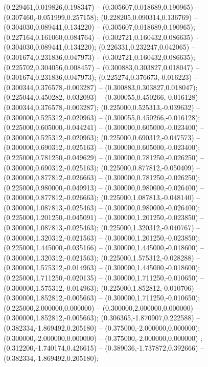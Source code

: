  (0.229461,0.019826,0.198347) -- (0.305607,0.018689,0.190965) -- (0.307460,-0.051999,0.257158);
 (0.228205,0.090314,0.136769) -- (0.304030,0.089441,0.134220) -- (0.305607,0.018689,0.190965);
 (0.227164,0.161060,0.084764) -- (0.302721,0.160432,0.086635) -- (0.304030,0.089441,0.134220);
 (0.226331,0.232247,0.042065) -- (0.301674,0.231836,0.047973) -- (0.302721,0.160432,0.086635);
 (0.225702,0.304056,0.008457) -- (0.300883,0.303827,0.018047) -- (0.301674,0.231836,0.047973);
 (0.225274,0.376673,-0.016223) -- (0.300344,0.376578,-0.003287) -- (0.300883,0.303827,0.018047);
 (0.225044,0.450282,-0.032093) -- (0.300055,0.450266,-0.016128) -- (0.300344,0.376578,-0.003287);
 (0.225000,0.525313,-0.039632) -- (0.300000,0.525312,-0.020963) -- (0.300055,0.450266,-0.016128);
 (0.225000,0.605000,-0.044241) -- (0.300000,0.605000,-0.023400) -- (0.300000,0.525312,-0.020963);
 (0.225000,0.690312,-0.047573) -- (0.300000,0.690312,-0.025163) -- (0.300000,0.605000,-0.023400);
 (0.225000,0.781250,-0.049629) -- (0.300000,0.781250,-0.026250) -- (0.300000,0.690312,-0.025163);
 (0.225000,0.877812,-0.050409) -- (0.300000,0.877812,-0.026663) -- (0.300000,0.781250,-0.026250);
 (0.225000,0.980000,-0.049913) -- (0.300000,0.980000,-0.026400) -- (0.300000,0.877812,-0.026663);
 (0.225000,1.087813,-0.048140) -- (0.300000,1.087813,-0.025463) -- (0.300000,0.980000,-0.026400);
 (0.225000,1.201250,-0.045091) -- (0.300000,1.201250,-0.023850) -- (0.300000,1.087813,-0.025463);
 (0.225000,1.320312,-0.040767) -- (0.300000,1.320312,-0.021563) -- (0.300000,1.201250,-0.023850);
 (0.225000,1.445000,-0.035166) -- (0.300000,1.445000,-0.018600) -- (0.300000,1.320312,-0.021563);
 (0.225000,1.575312,-0.028288) -- (0.300000,1.575312,-0.014963) -- (0.300000,1.445000,-0.018600);
 (0.225000,1.711250,-0.020135) -- (0.300000,1.711250,-0.010650) -- (0.300000,1.575312,-0.014963);
 (0.225000,1.852812,-0.010706) -- (0.300000,1.852812,-0.005663) -- (0.300000,1.711250,-0.010650);
 (0.225000,2.000000,0.000000) -- (0.300000,2.000000,0.000000) -- (0.300000,1.852812,-0.005663);
 (0.306365,-1.870907,0.222588) -- (0.382334,-1.869492,0.205180) -- (0.375000,-2.000000,0.000000);
 (0.300000,-2.000000,0.000000) -- (0.375000,-2.000000,0.000000) ;
 (0.312200,-1.740174,0.426615) -- (0.389036,-1.737872,0.392666) -- (0.382334,-1.869492,0.205180);
